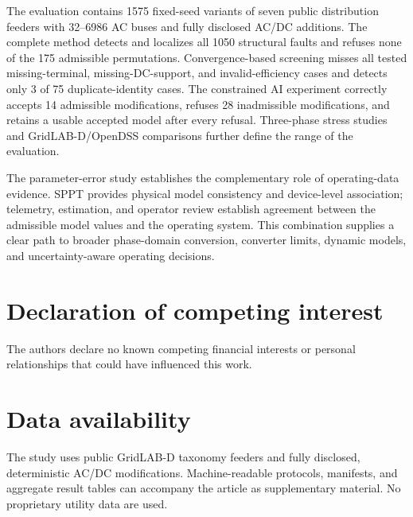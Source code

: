 \documentclass[final,5p,times,twocolumn]{elsarticle}
\begin{document}
The evaluation contains 1575 fixed-seed variants of seven public distribution
feeders with 32--6986 AC buses and fully disclosed AC/DC additions. The complete
method detects and localizes all 1050 structural faults and refuses none of the
175 admissible permutations. Convergence-based screening misses all tested
missing-terminal, missing-DC-support, and invalid-efficiency cases and detects
only 3 of 75 duplicate-identity cases. The constrained AI experiment correctly
accepts 14 admissible modifications, refuses 28 inadmissible modifications, and
retains a usable accepted model after every refusal. Three-phase stress studies
and GridLAB-D/OpenDSS comparisons further define the range of the evaluation.

The parameter-error study establishes the complementary role of operating-data
evidence. SPPT provides physical model consistency and device-level association;
telemetry, estimation, and operator review establish agreement between the
admissible model values and the operating system. This combination supplies a
clear path to broader phase-domain conversion, converter limits, dynamic
models, and uncertainty-aware operating decisions.

\section*{Declaration of competing interest}
The authors declare no known competing financial interests or personal
relationships that could have influenced this work.

\section*{Data availability}
The study uses public GridLAB-D taxonomy feeders and fully disclosed,
deterministic AC/DC modifications. Machine-readable protocols, manifests, and
aggregate result tables can accompany the article as supplementary material. No
proprietary utility data are used.
\end{document}
